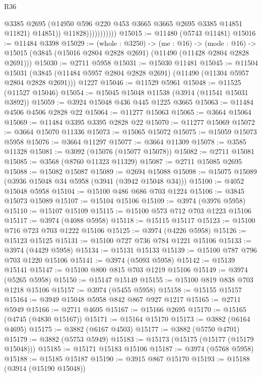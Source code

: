 \begin{lexlean}{R36}
\begin{coremodule}
                              @3385
                              @2695
                              (@14950 @596 @220 @453 @3665 @3665 @2695 @3385 @14851 @11821)
                              @14851))
                          @11828)))))))))))
@15015 := @11480 (@5743 @11481)
@15016 := @11484 @3398
@15029 := (whole : @3250) ->
  (me : @16) ->
  (mode : @16) -> @15015 (@3845 (@15016 @2804 @2828 @2691) (@11490 (@11428 @2804 @2828 @2691)))
@15030 := @2711 @5958
@15031 := @15030 @11481
@15045 := @11504
    @15031
    (@3845 (@11484 @5957 @2804 @2828 @2691) (@11490 (@11304 @5957 @2804 @2828 @2691)))
    @1227
@15046 := @11529 @5961
@15048 := @11525 (@11527 @15046)
@15054 := @15045 @15048 @11538 (@3914 (@11541 @15031 @3892))
@15059 := @3924 @15048 @436 @445 @1225 @3665
@15063 := @11484 @4506 @4506 @2828 @22
@15064 := @11277 @15063
@15065 := @3664 @15064
@15069 := @11484 @3395 @3395 @2828 @22
@15070 := @11277 @15069
@15072 := @3664 @15070 @11336
@15073 := @15065 @15072
@15075 := @15059 @15073 @5958
@15076 := @3664 @11297
@15077 := @3664 @11309
@15078 := @3585 @11328
@15081 := @3092 (@15076 (@15077 @15078))
@15082 := @2711 @15081
@15085 := @3568 (@8760 @11323 @11329)
@15087 := @2711 @15085 @2695
@15088 := @15082 @15087
@15089 := @2694 @15088
@15098 := @15075 @15089 (@3936 @15048 @34 @5958 (@3941 (@3942 @15048 @34)))
@15100 := @4052 @15048 @5958
@15104 := @15100 @486 @686 @703 @1224
@15106 := @3845 @15073 @15089
@15107 := @15104 @15106
@15109 := @3974 (@3976 @5958)
@15110 := @15107 @15109
@15115 := @15100 @573 @712 @703 @1223 @15106
@15117 := @3974 (@4088 @5958)
@15118 := @15115 @15117
@15123 := @15100 @716 @723 @703 @1222 @15106
@15125 := @3974 (@4226 @5958)
@15126 := @15123 @15125
@15131 := @15100 @727 @736 @784 @1221 @15106
@15133 := @3974 (@4429 @5958)
@15134 := @15131 @15133
@15139 := @15100 @787 @796 @703 @1220 @15106
@15141 := @3974 (@5093 @5958)
@15142 := @15139 @15141
@15147 := @15100 @800 @815 @703 @1219 @15106
@15149 := @3974 (@5265 @5958)
@15150 := @15147 @15149
@15155 := @15100 @819 @838 @703 @1218 @15106
@15157 := @3974 (@5455 @5958)
@15158 := @15155 @15157
@15164 := @3949 @15048 @5958 @842 @867 @927 @1217
@15165 := @2711 @5949
@15166 := @2711 @4695
@15167 := @15166 @2695
@15170 := @15165 (@4745 (@4830 @15167))
@15171 := @15164 @15170
@15173 := @3882 (@6164 @4695)
@15175 := @3882 (@6167 @4503)
@15177 := @3882 (@5750 @4701)
@15179 := @3882 (@5753 @5949)
@15183 := @15173 (@15175 (@15177 (@15179 @15048)))
@15185 := @15171 @15183 @15106
@15187 := @3974 (@5768 @5958)
@15188 := @15185 @15187
@15190 := @3915 @867 @15170
@15193 := @15188 (@3914 (@15190 @15048))

\end{coremodule}
\end{lexlean}
